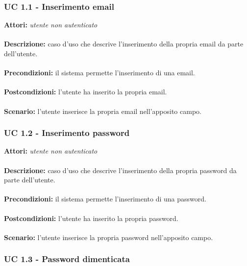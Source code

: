 \documentclass[a4paper,11pt]{article}
\begin{document}
\subsubsection{UC 1.1 - Inserimento email}

\textbf{Attori:} \textit{utente non autenticato}
\\ \\
\textbf{Descrizione:} caso d'uso che descrive l'inserimento della propria email da parte dell'utente.\\
\\
\textbf{Precondizioni:} il sistema permette l'inserimento di una email.\\
\\
\textbf{Postcondizioni:} l’utente ha inserito la propria email.\\
\\
\textbf{Scenario:} l’utente inserisce la propria email nell'apposito campo.\\


\subsubsection{UC 1.2 - Inserimento password}

\textbf{Attori:} \textit{utente non autenticato}
\\ \\
\textbf{Descrizione:} caso d'uso che descrive l'inserimento della propria password da parte dell'utente.\\
\\
\textbf{Precondizioni:} il sistema permette l'inserimento di una password.\\
\\
\textbf{Postcondizioni:} l’utente ha inserito la propria password.\\
\\
\textbf{Scenario:} l’utente inserisce la propria password nell'apposito campo.\\


\newpage
\subsubsection{UC 1.3 - Password dimenticata}
\end{document}
